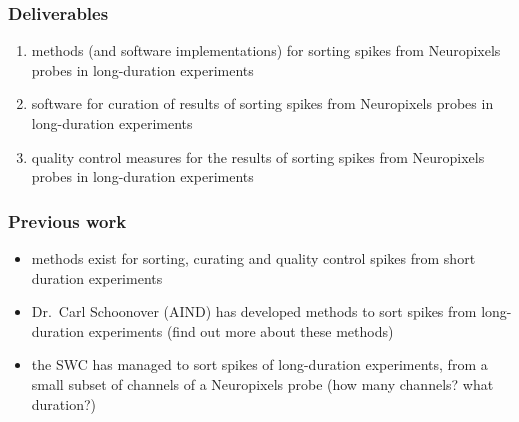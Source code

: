 
\begin{frame}
    \frametitle{Deliverables}

    \begin{enumerate}

        \item methods (and software implementations) for sorting spikes from
        Neuropixels probes in long-duration experiments

        \item software for curation of results of sorting spikes from Neuropixels
        probes in long-duration experiments

        \item quality control measures for the results of sorting spikes from
        Neuropixels probes in long-duration experiments

    \end{enumerate}

\end{frame}

\begin{frame}
    \frametitle{Previous work}

    \begin{itemize}

        \item methods exist for sorting, curating and quality control spikes from
        short duration experiments

        \item Dr.~Carl Schoonover (AIND) has developed methods to sort spikes from
        long-duration experiments (find out more about these methods)

        \item the SWC has managed to sort spikes of long-duration experiments, from
        a small subset of channels of a Neuropixels probe (how many channels?
        what duration?)

    \end{itemize}

\end{frame}
